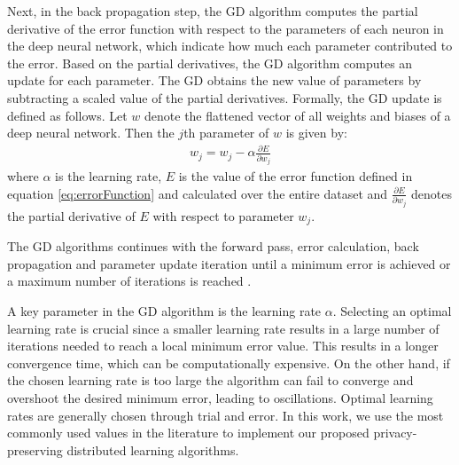 \documentclass[letterpaper]{article}
\begin{document}
\begin{flushleft}
{%
Next, in the back propagation step, the GD algorithm 
computes the partial derivative of the error function with respect to the
parameters of each neuron in the deep neural network, which indicate how much each parameter contributed to
the error. Based on the partial derivatives, the GD algorithm computes an update for each parameter. 
The GD  obtains the new value of parameters by subtracting a scaled value of the partial derivatives. Formally, the GD update is
defined as follows.  Let $w$ denote the flattened vector of all weights and biases of a deep neural
network. Then the $j$th parameter of $w$ is given by:
\begin{align}\label{eq:GD}
w_j = w_j -\alpha \frac{\partial E}{\partial w_j}
\end{align}
where $\alpha$ is the learning rate,  $E$ is the value of the error function defined in equation \eqref{eq:errorFunction} and calculated over the entire dataset and $\frac{\partial E}{\partial w_j}$ denotes the partial derivative of $E$ with respect to
parameter $w_j$.

The GD algorithms continues with the forward pass, error calculation, back propagation and parameter update iteration until a minimum
error is achieved or a maximum number of iterations is reached \cite{ruder2016overview}. 

A key parameter in the GD algorithm is the learning rate $\alpha$.   Selecting an optimal learning
rate is crucial since a smaller learning rate results in a large number of iterations needed to reach a local minimum error value. This
results in a longer convergence time, which can be computationally expensive. On the other hand, if the chosen learning rate is too
large the algorithm can fail to converge and overshoot the desired minimum error, leading to oscillations.  Optimal learning rates are
generally chosen through trial and error. In this work, we use the most commonly used values in the literature to implement our
proposed privacy-preserving distributed learning algorithms. 

}
\end{flushleft}
\end{document}
